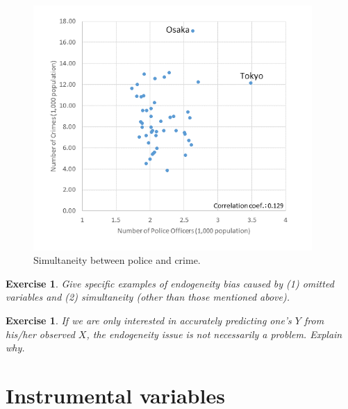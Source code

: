 \documentclass[10.5pt, A4paper, openany, uplatex]{book}
\newtheorem{exercise}[theorem]{Exercise}
\numberwithin{equation}{section}
\begin{document}
\begin{figure}[h!]
	\begin{center}
		\includegraphics[width = 10.6cm]{polcrime.png}
		\caption{Simultaneity between police and crime.}
	\end{center}
\end{figure}

\begin{framed}
\begin{exercise}\upshape
	Give specific examples of endogeneity bias caused by (1) omitted variables and (2) simultaneity (other than those mentioned above).
\end{exercise}

\begin{exercise}\upshape
	If we are only interested in accurately predicting one's $Y$ from his/her observed $X$, the endogeneity issue is not necessarily a problem.
	Explain why.
\end{exercise}
\end{framed}

\section{Instrumental variables}
\end{document}

